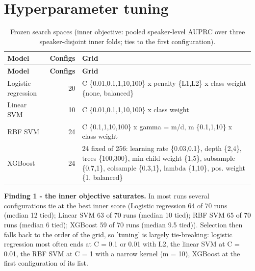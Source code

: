 \documentclass[10pt,a4paper]{article}
\begin{document}
\section{Hyperparameter tuning}\label{sec:tuning}
\begin{center}\scriptsize\renewcommand{\arraystretch}{1.12}
\begin{longtable}{lrp{11.5cm}}
\caption{Frozen search spaces (inner objective: pooled speaker-level AUPRC over three speaker-disjoint inner folds; ties to the first configuration).}\\
\toprule
\textbf{Model} & \textbf{Configs} & \textbf{Grid}\\\midrule\endfirsthead
\toprule
\textbf{Model} & \textbf{Configs} & \textbf{Grid}\\\midrule\endhead
\bottomrule\endfoot
Logistic regression & 20 & C \{0.01,0.1,1,10,100\} x penalty \{L1,L2\} x class weight \{none, balanced\}\\
Linear SVM & 10 & C \{0.01,0.1,1,10,100\} x class weight\\
RBF SVM & 24 & C \{0.1,1,10,100\} x gamma = m/d, m \{0.1,1,10\} x class weight\\
XGBoost & 24 & 24 fixed of 256: learning rate \{0.03,0.1\}, depth \{2,4\}, trees \{100,300\}, min child weight \{1,5\}, subsample \{0.7,1\}, colsample \{0.3,1\}, lambda \{1,10\}, pos. weight \{1, balanced\}\\
\end{longtable}\end{center}
\textbf{Finding 1 - the inner objective saturates.} In most runs several configurations tie at the best inner score (Logistic regression 64 of 70 runs (median 12 tied); Linear SVM 63 of 70 runs (median 10 tied); RBF SVM 65 of 70 runs (median 6 tied); XGBoost 59 of 70 runs (median 9.5 tied)). Selection then falls back to the order of the grid, so 'tuning' is largely tie-breaking: logistic regression most often ends at C = 0.1 or 0.01 with L2, the linear SVM at C = 0.01, the RBF SVM at C = 1 with a narrow kernel (m = 10), XGBoost at the first configuration of its list.
\end{document}
